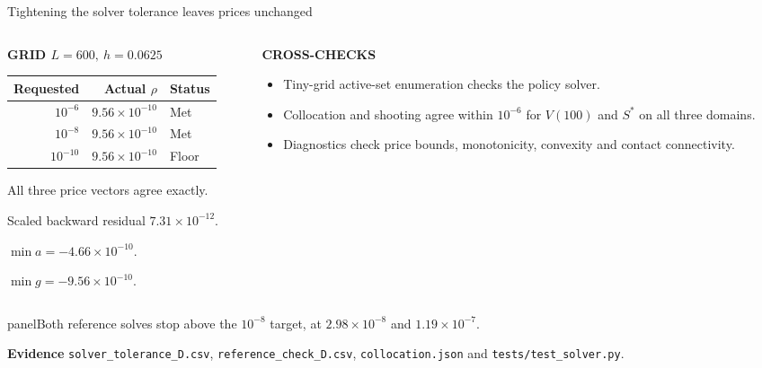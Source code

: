 \documentclass[aspectratio=169,11pt]{beamer}
\newcommand{\panel}[1]{%
  \begin{beamercolorbox}[wd=\linewidth,sep=2.2mm]{panel}#1\end{beamercolorbox}}
\newcommand{\labeltext}[1]{{\footnotesize\bfseries\color{Teal}#1}}
\newcommand{\sourcefile}[1]{\par\vfill{\scriptsize\color{Muted}#1\par}}
\begin{document}
\begin{frame}[t]{Tightening the solver tolerance leaves prices unchanged}
  \begin{columns}[T,onlytextwidth]
    \begin{column}{.49\textwidth}
      \labeltext{GRID $L=600,\ h=0.0625$}\par\smallskip
      {\small
      \renewcommand{\arraystretch}{1.06}
      \begin{tabular}{@{}rrl@{}}
        \toprule
        Requested & Actual $\rho$ & Status \\
        \midrule
        $10^{-6}$ & $9.56\times10^{-10}$ & Met \\
        $10^{-8}$ & $9.56\times10^{-10}$ & Met \\
        $10^{-10}$ & $9.56\times10^{-10}$ & Floor \\
        \bottomrule
      \end{tabular}\par}
      \smallskip
      \small All three price vectors agree exactly.\par
      Scaled backward residual $7.31\times10^{-12}$.\par
      $\min a=-4.66\times10^{-10}$.\par
      $\min g=-9.56\times10^{-10}$.
    \end{column}
    \begin{column}{.47\textwidth}
      \labeltext{CROSS-CHECKS}\par\smallskip
      \small
      \begin{itemize}
        \item Tiny-grid active-set enumeration checks the policy solver.
        \item Collocation and shooting agree within $10^{-6}$ for
              $V(100)$ and $S^*$ on all three domains.
        \item Diagnostics check price bounds, monotonicity,
              convexity and contact connectivity.
      \end{itemize}
    \end{column}
  \end{columns}
  \smallskip
  \panel{\small Both reference solves stop above the $10^{-8}$ target,
    at $2.98\times10^{-8}$ and $1.19\times10^{-7}$.}
  \sourcefile{\textbf{Evidence} \enspace \texttt{solver\_tolerance\_D.csv}, \texttt{reference\_check\_D.csv}, \texttt{collocation.json} and \texttt{tests/test\_solver.py}.}
\end{frame}
\end{document}
